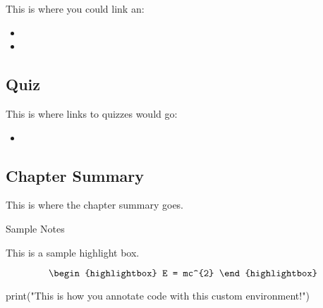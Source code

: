 This is where you could link an:

\begin{itemize}
    \item {}
    \item {}
\end{itemize}

\subsection{Quiz}

This is where links to quizzes would go:

\begin{itemize}
    \item {}
\end{itemize}

\subsection{Chapter Summary}

This is where the chapter summary goes.

\begin{notes}{Sample Notes}
    \begin{highlight}
        This is a sample highlight box.

        \begin{equation*}
            \begin{highlightbox}
                E = mc^{2}
            \end{highlightbox}
        \end{equation*}
        \lipsum[1-5]
    \end{highlight}
    \begin{code}[Python]
    print("This is how you annotate code with this custom environment!")
    \end{code}
\end{notes}